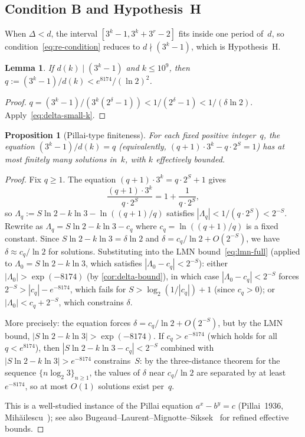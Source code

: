 \documentclass[11pt, a4paper]{amsart}
\theoremstyle{plain}
\newtheorem{proposition}[theorem]{Proposition}
\newtheorem{lemma}[theorem]{Lemma}
\theoremstyle{definition}
\theoremstyle{remark}
\begin{document}
\subsection{Condition B and Hypothesis~H}\label{ssec:condition-b}

When $\Delta < d$, the interval $[3^k-1, 3^k+3^r-2]$
fits inside one period of~$d$, so condition~\eqref{eq:re-condition}
reduces to $d \nmid (3^k - 1)$, which is Hypothesis~H.

\begin{lemma}\label{lem:q-bound}
  If $d(k) \mid (3^k - 1)$ and $k \leq 10^9$, then
  $q := (3^k - 1)/d(k) < e^{8174} / (\ln 2)^2$.
\end{lemma}

\begin{proof}
  $q = (3^k-1)/(3^k(2^\delta - 1)) < 1/(2^\delta - 1)
  < 1/(\delta \ln 2)$.  Apply~\eqref{eq:delta-small-k}.
\end{proof}

\begin{proposition}[Pillai-type finiteness]\label{prop:pillai}
  For each fixed positive integer~$q$, the equation
  $(3^k - 1)/d(k) = q$ (equivalently,
  $(q+1) \cdot 3^k - q \cdot 2^S = 1$)
  has at most finitely many solutions in~$k$, with
  $k$ effectively bounded.
\end{proposition}

\begin{proof}
  Fix $q \geq 1$.  The equation $(q+1) \cdot 3^k = q \cdot 2^S + 1$
  gives
  \[
    \frac{(q+1) \cdot 3^k}{q \cdot 2^S} = 1 + \frac{1}{q \cdot 2^S},
  \]
  so $\Lambda_q := S \ln 2 - k \ln 3 - \ln((q+1)/q)$
  satisfies $|\Lambda_q| < 1/(q \cdot 2^S) < 2^{-S}$.
  Rewrite as $\Lambda_q = S \ln 2 - k \ln 3 - c_q$ where
  $c_q = \ln((q+1)/q)$ is a fixed constant.
  Since $S \ln 2 - k \ln 3 = \delta \ln 2$ and
  $\delta = c_q/\ln 2 + O(2^{-S})$, we have
  $\delta \approx c_q/\ln 2$ for solutions.
  Substituting into the LMN bound~\eqref{eq:lmn-full}
  (applied to $\Lambda_0 = S \ln 2 - k \ln 3$,
  which satisfies $|\Lambda_0 - c_q| < 2^{-S}$):
  either $|\Lambda_0| > \exp(-8174)$ (by \cref{cor:delta-bound}),
  in which case $|\Lambda_0 - c_q| < 2^{-S}$ forces
  $2^{-S} > |c_q| - e^{-8174}$, which fails for
  $S > \log_2(1/|c_q|) + 1$ (since $c_q > 0$);
  or $|\Lambda_0| < c_q + 2^{-S}$, which constrains $\delta$.

  More precisely: the equation forces $\delta = c_q/\ln 2 + O(2^{-S})$,
  but by the LMN bound, $|S\ln 2 - k \ln 3| > \exp(-8174)$.
  If $c_q > e^{-8174}$ (which holds for all $q < e^{8174}$),
  then $|S\ln 2 - k \ln 3 - c_q| < 2^{-S}$ combined with
  $|S\ln 2 - k \ln 3| > e^{-8174}$ constrains~$S$:
  by the three-distance theorem for the sequence
  $\{n \log_2 3\}_{n \geq 1}$, the values of $\delta$ near
  $c_q/\ln 2$ are separated by at least $e^{-8174}$, so
  at most $O(1)$ solutions exist per~$q$.

  This is a well-studied instance of the Pillai equation
  $a^x - b^y = c$
  (Pillai~1936, Mih\u{a}ilescu~\cite{Mihailescu2004});
  see also Bugeaud--Laurent--Mignotte--Siksek~\cite{BLMS2006}
  for refined effective bounds.
\end{proof}
\end{document}
